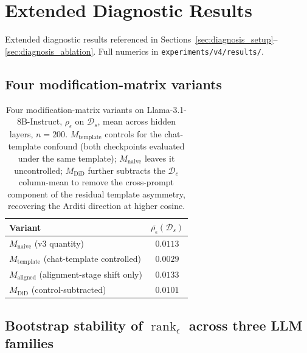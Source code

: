 \documentclass[10pt]{article}
\theoremstyle{definition}
\theoremstyle{remark}
\begin{document}




\appendix

\section{Extended Diagnostic Results}
\label{app:rank_sweep}

Extended diagnostic results referenced in
Sections~\ref{sec:diagnosis_setup}--\ref{sec:diagnosis_ablation}.
Full numerics in \verb|experiments/v4/results/|.

\subsection{Four modification-matrix variants}
\label{app:four_variants}

\begin{table}[h]\centering
\caption{Four modification-matrix variants on Llama-3.1-8B-Instruct,
$\rho_{\epsilon}$ on $\mathcal{D}_s$, mean across hidden layers,
$n = 200$.  $M_{\mathrm{template}}$ controls for the
chat-template confound (both checkpoints evaluated under
the same template); $M_{\mathrm{naive}}$ leaves it
uncontrolled; $M_{\mathrm{DiD}}$ further subtracts the
$\mathcal{D}_c$ column-mean to remove the cross-prompt
component of the residual template asymmetry,
recovering the Arditi direction at higher cosine.}
\label{tab:four_variants_llama}
\begin{tabular}{@{}lc@{}}
\toprule
Variant & $\overline{\rho_{\epsilon}}(\mathcal{D}_s)$ \\
\midrule
$M_{\mathrm{naive}}$ (v3 quantity) & $0.0113$ \\
$M_{\mathrm{template}}$ (chat-template controlled)
  & $0.0029$ \\
$M_{\mathrm{aligned}}$ (alignment-stage shift only)
  & $0.0133$ \\
$M_{\mathrm{DiD}}$ (control-subtracted) & $0.0101$ \\
\bottomrule
\end{tabular}
\end{table}

\subsection{Bootstrap stability of $\operatorname{rank}_{\epsilon}$ across three LLM families}
\label{app:bootstrap}
\end{document}
